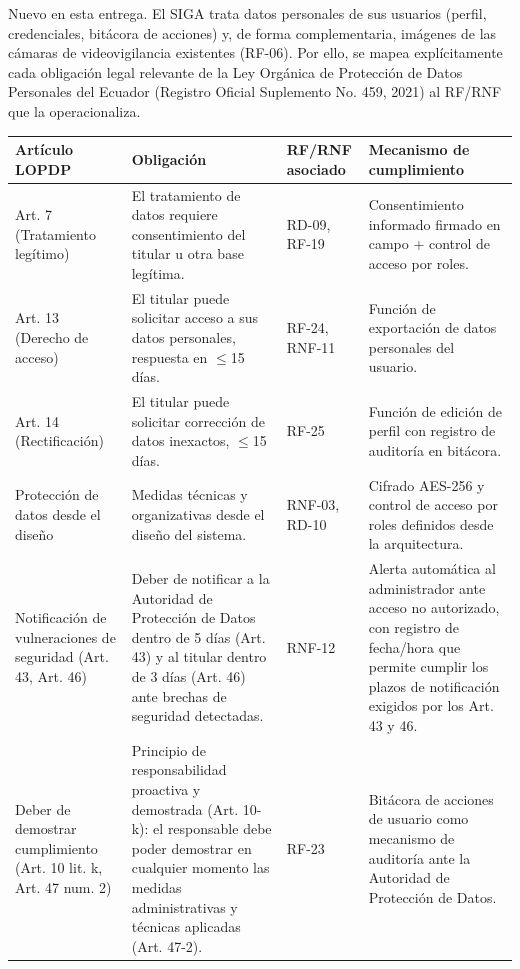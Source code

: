 
Nuevo en esta entrega. El SIGA trata datos personales de sus usuarios (perfil, credenciales, bitácora de acciones) y, de forma complementaria, imágenes de las cámaras de videovigilancia existentes (RF-06). Por ello, se mapea explícitamente cada obligación legal relevante de la Ley Orgánica de Protección de Datos Personales del Ecuador (Registro Oficial Suplemento No. 459, 2021) al RF/RNF que la operacionaliza.




\begingroup
\small
\begin{longtable}{|P{0.2500}|P{0.2500}|P{0.2500}|P{0.2500}|}
\hline
Artículo LOPDP & Obligación & RF/RNF asociado & Mecanismo de cumplimiento \\ \hline
Art. 7 (Tratamiento legítimo) & El tratamiento de datos requiere consentimiento del titular u otra base legítima. & RD-09, RF-19 & Consentimiento informado firmado en campo + control de acceso por roles. \\ \hline
Art. 13 (Derecho de acceso) & El titular puede solicitar acceso a sus datos personales, respuesta en $\leq$15 días. & RF-24, RNF-11 & Función de exportación de datos personales del usuario. \\ \hline
Art. 14 (Rectificación) & El titular puede solicitar corrección de datos inexactos, $\leq$15 días. & RF-25 & Función de edición de perfil con registro de auditoría en bitácora. \\ \hline
Protección de datos desde el diseño & Medidas técnicas y organizativas desde el diseño del sistema. & RNF-03, RD-10 & Cifrado AES-256 y control de acceso por roles definidos desde la arquitectura. \\ \hline
Notificación de vulneraciones de seguridad (Art. 43, Art. 46) & Deber de notificar a la Autoridad de Protección de Datos dentro de 5 días (Art. 43) y al titular dentro de 3 días (Art. 46) ante brechas de seguridad detectadas. & RNF-12 & Alerta automática al administrador ante acceso no autorizado, con registro de fecha/hora que permite cumplir los plazos de notificación exigidos por los Art. 43 y 46. \\ \hline
Deber de demostrar cumplimiento (Art. 10 lit. k, Art. 47 num. 2) & Principio de responsabilidad proactiva y demostrada (Art. 10-k): el responsable debe poder demostrar en cualquier momento las medidas administrativas y técnicas aplicadas (Art. 47-2). & RF-23 & Bitácora de acciones de usuario como mecanismo de auditoría ante la Autoridad de Protección de Datos. \\ \hline

\end{longtable}
